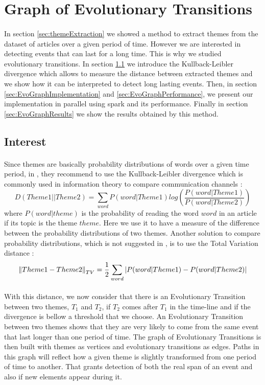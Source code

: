 \section{Graph of Evolutionary Transitions}
\paragraph{}
In section \ref{sec:themeExtraction} we showed a method to extract themes from the dataset of articles over a given period of time. However we are interested in detecting events that can last for a long time. This is why we studied evolutionary transitions. In section \ref{sec:EvoGraphInterest} we introduce the Kullback-Leibler divergence which allows to measure the distance between extracted themes and we show how it can be interpreted to detect long lasting events. Then, in section \ref{sec:EvoGraphImplementation} and \ref{sec:EvoGraphPerformance}, we present our implementation in parallel using spark and its performance. Finally in section \ref{sec:EvoGraphResults} we show the results obtained by this method.

\subsection{Interest}
\label{sec:EvoGraphInterest}

\paragraph{}
Since themes are basically probability distributions of words over a given time period, in \cite{kdd05-ttm}, they recommend to use the Kullback-Leibler divergence which is commonly used in information theory to compare communication channels \cite{kullback1997information} :\[ D(Theme1 || Theme2) = \sum_{word} P(word|Theme1) log(\frac{P(word|Theme1)}{P(word|Theme2)})\]where $P(word|theme)$ is the probability of reading the word $word$ in an article if its topic is the theme $theme$. Here we use it to have a measure of the difference between the probability distributions of two themes. Another solution to compare probability distributions, which is not suggested in \cite{kdd05-ttm}, is to use the Total Variation distance \cite{INSR419} :\[ \left\lVert Theme1 - Theme2\right\rVert_{TV} = \frac{1}{2} \sum_{word} |P(word|Theme1) - P(word|Theme2)|\]

\paragraph{}
With this distance, we now consider that there is an Evolutionary Transition between two themes, $T_1$ and $T_2$, if $T_2$ comes after $T_1$ in the time-line and if the divergence is bellow a threshold that we choose. An Evolutionary Transition between two themes shows that they are very likely to come from the same event that last longer than one period of time. The graph of Evolutionary Transitions is then built with themes as vertices and evolutionary transitions as edges. Paths in this graph will reflect how a given theme is slightly transformed from one period of time to another. That grants detection of both the real span of an event and also if new elements appear during it.

